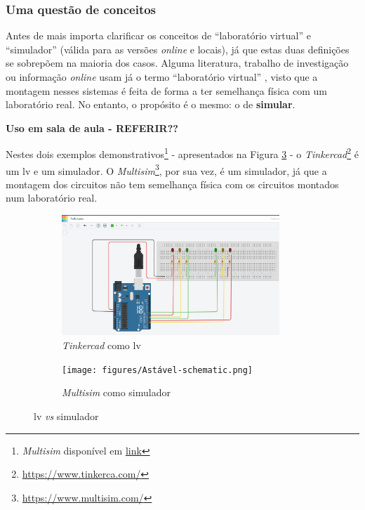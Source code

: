 \subsubsection{Uma questão de conceitos}
Antes de mais importa clarificar os conceitos de ``laboratório virtual'' e ``simulador'' (válida para as versões \textit{online} e locais), já que estas duas definições se sobrepõem na maioria dos casos.
Alguma literatura, trabalho de investigação ou informação \textit{online} usam já o termo ``laboratório virtual'' \cite{BRINSON2015218}\cite{virtuallabng}\cite{EMaster2024May}, visto que a montagem nesses sistemas é feita de forma a ter semelhança física com um laboratório real. No entanto, o propósito é o mesmo: o de \textbf{simular}.

\textbf{Uso em sala de aula - REFERIR??}

Nestes dois exemplos demonstrativos\footnote{\textit{Multisim} disponível em \href{https://www.ni.com/en/support/downloads/software-products/download.multisim.html\#452133}{link}} - apresentados na Figura \ref{fig:tinkercad} - o \textit{Tinkercad}\footnote{\url{https://www.tinkerca.com/}} é um \acrshort{lv} e um simulador. O \textit{Multisim}\footnote{\url{https://www.multisim.com/}}, por sua vez, é um simulador, já que a montagem dos circuitos não tem semelhança física com os circuitos montados num laboratório real.

\begin{figure}[hbtp]
    \centering
    \begin{subfigure}[hbtp]{0.48\textwidth}
        \centering
        \includegraphics[width=0.9\textwidth]{figures/tinkercad_exemplo.png}
        \caption{\textit{Tinkercad} como \acrshort{lv}}
        \label{fig:tinkercadVL}
    \end{subfigure}
    \begin{subfigure}[hbtp]{0.48\textwidth}
        \texttt{[image: figures/Astável-schematic.png]}
        \caption{\textit{Multisim} como simulador}
        \label{fig:tinkercadOS}
    \end{subfigure}
    \caption{\acrshort{lv} \textit{vs} simulador}
    \label{fig:tinkercad}
\end{figure}


